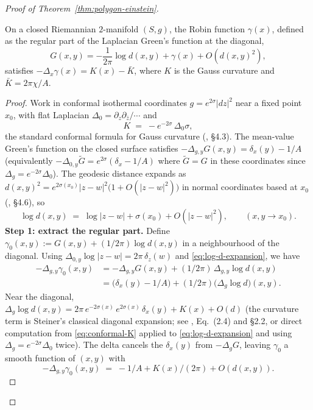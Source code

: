 \begin{proof}[Proof of Theorem~\ref{thm:polygon-einstein}]
\begin{lemma}\label{lem:robin-identity}
On a closed Riemannian $2$-manifold $(S,g)$, the Robin
function $\gamma(x)$, defined as the regular part of the
Laplacian Green's function at the diagonal,
\[
  G(x,y) = -\frac{1}{2\pi}\log d(x,y) + \gamma(x)
  + O(d(x,y)^2),
\]
satisfies $-\Delta_x\gamma(x) = K(x) - \bar K$,
where $K$ is the Gauss curvature and $\bar K = 2\pi\chi/A$.
\end{lemma}
\begin{proof}
Work in conformal isothermal coordinates $g = e^{2\sigma}|dz|^2$
near a fixed point $x_0$, with flat Laplacian $\Delta_0 =
\partial_{z}\partial_{\bar z}/\cdots$ and
\begin{equation}\label{eq:conformal-K}
  K \;=\; -e^{-2\sigma}\,\Delta_0\sigma,
\end{equation}
the standard conformal formula for Gauss curvature
(\citealt{doCarmo1992}, \S4.3).  The mean-value Green's
function on the closed surface satisfies
$-\Delta_{g,y} G(x,y) = \delta_x(y) - 1/A$
(equivalently $-\Delta_{0,y}\tilde G = e^{2\sigma}(\delta_x - 1/A)$
where $\tilde G = G$ in these coordinates since
$\Delta_g = e^{-2\sigma}\Delta_0$).
The geodesic distance expands as
$d(x,y)^2 = e^{2\sigma(x_0)}|z{-}w|^2\bigl(1 +
O(|z{-}w|^2)\bigr)$ in normal coordinates based at $x_0$
(\citealt{doCarmo1992}, \S4.6), so
\begin{equation}\label{eq:log-d-expansion}
  \log d(x,y) \;=\; \log|z{-}w| + \sigma(x_0) +
  O(|z{-}w|^2),
  \qquad (x, y \to x_0).
\end{equation}
\textbf{Step 1: extract the regular part.}
Define
$\gamma_0(x, y) := G(x, y) + (1/2\pi)\log d(x, y)$
in a neighbourhood of the diagonal.  Using
$\Delta_{0,y}\log|z{-}w| = 2\pi\,\delta_{z}(w)$ and
\eqref{eq:log-d-expansion}, we have
\begin{align*}
  -\Delta_{g,y}\gamma_0(x, y)
  &= -\Delta_{g, y} G(x, y)
     + (1/2\pi)\,\Delta_{g, y}\log d(x, y)
  \\
  &= \bigl(\delta_x(y) - 1/A\bigr)
     + (1/2\pi)\bigl(\Delta_g \log d\bigr)(x, y).
\end{align*}
Near the diagonal, $\Delta_g\log d(x,y) = 2\pi\,e^{-2\sigma(x)}\,
e^{2\sigma(x)}\,\delta_x(y) + K(x) + O(d)$ (the curvature term
is Steiner's classical diagonal expansion; see
\citealt{Okikiolu2008}, Eq.~(2.4) and \S2.2, or direct
computation from \eqref{eq:conformal-K} applied to
\eqref{eq:log-d-expansion} and using
$\Delta_g = e^{-2\sigma}\Delta_0$ twice).
The delta cancels the $\delta_x(y)$ from $-\Delta_g G$,
leaving $\gamma_0$ a smooth function of $(x,y)$ with
\begin{equation}\label{eq:robin-off-diag}
  -\Delta_{g, y} \gamma_0(x, y)
  \;=\; -1/A + K(x)/(2\pi) + O(d(x,y)).
\end{equation}


\end{proof}
\end{proof}
